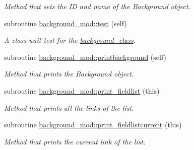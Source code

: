 \begin{DoxyCompactItemize}
\begin{DoxyCompactList}\small\item\em Method that sets the ID and name of the Background object. \end{DoxyCompactList}\item 
subroutine \mbox{\hyperlink{namespacebackground__mod_a3cee95b9b5d3aae83df33334981f2b27}{background\+\_\+mod\+::test}} (self)
\begin{DoxyCompactList}\small\item\em A class \textquotesingle{}unit\textquotesingle{} test for the \mbox{\hyperlink{structbackground__mod_1_1background__class}{background\+\_\+class}}. \end{DoxyCompactList}\item 
subroutine \mbox{\hyperlink{namespacebackground__mod_a8a8f225cffcddb742f22a402155b703f}{background\+\_\+mod\+::printbackground}} (self)
\begin{DoxyCompactList}\small\item\em Method that prints the Background object. \end{DoxyCompactList}\item 
subroutine \mbox{\hyperlink{namespacebackground__mod_acdcc52b4fb298bc145a121f9e8a4b929}{background\+\_\+mod\+::print\+\_\+fieldlist}} (this)
\begin{DoxyCompactList}\small\item\em Method that prints all the links of the list. \end{DoxyCompactList}\item 
subroutine \mbox{\hyperlink{namespacebackground__mod_a2bd18f3830c0667741efd086d36753db}{background\+\_\+mod\+::print\+\_\+fieldlistcurrent}} (this)
\begin{DoxyCompactList}\small\item\em Method that prints the current link of the list. \end{DoxyCompactList}\end{DoxyCompactItemize}
